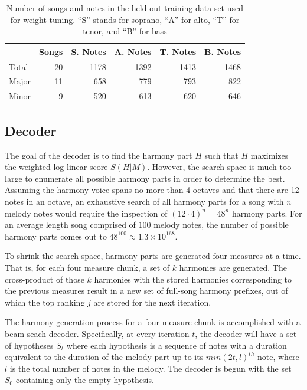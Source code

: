 \documentclass{sig-alternate}
\begin{document}
\begin{table}[h]
  \begin{center}
      \begin{tabular}{| l | r | r | r | r | r |}
      \hline
       \  & Songs & S. Notes & A. Notes & T. Notes & B. Notes \\ \hline
       Total &  20 & 1178 & 1392 & 1413 & 1468 \\ 
       Major &  11 & 658 & 779 & 793 & 822 \\ 
       Minor & 9 & 520 & 613 & 620 & 646  \\ \hline
      \end{tabular}
  \end{center}
  \caption{Number of songs and notes in the held out training data set used for weight tuning. ``S'' stands for soprano, ``A'' for alto, ``T'' for tenor, and ``B'' for bass}
\end{table}

\subsection {Decoder}
The goal of the decoder is to find the harmony part $H$ such that $H$ maximizes the weighted log-linear score $S(H | M)$. However, the search space is much too large to enumerate all possible harmony parts in order to determine the best. Assuming the harmony voice spans no more than 4 octaves and that there are 12 notes in an octave, an exhaustive search of all harmony parts for a song with $n$ melody notes would require the inspection of $(12\cdot 4)^{n} = 48^{n}$ harmony parts. For an average length song comprised of $100$ melody notes, the number of possible harmony parts comes out to $48^{100} \approx 1.3\times10^{168}$. 

To shrink the search space, harmony parts are generated four measures at a time. That is, for each four measure chunk, a set of $k$ harmonies are generated. The cross-product of those $k$ harmonies with the stored harmonies corresponding to the previous measures result in a new set of full-song harmony prefixes, out of which the top ranking $j$ are stored for the next iteration.

The harmony generation process for a four-measure chunk is accomplished with a beam-seach decoder. Specifically, at every iteration $t$, the decoder will have a set of hypotheses $S_{t}$ where each hypothesis is a sequence of notes with a duration equivalent to the duration of the melody part up to its $min(2t, l)^{th}$ note, where $l$ is the total number of notes in the melody. The decoder is begun with the set $S_{0}$ containing only the empty hypothesis. 
\end{document}
